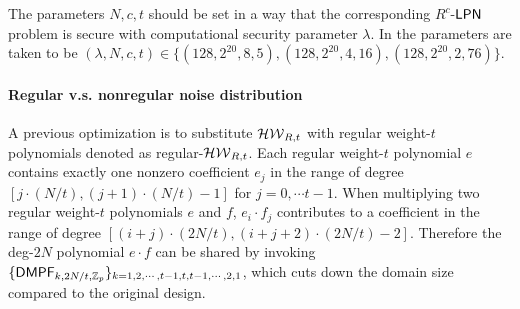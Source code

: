 The parameters $N, c, t$ should be set in a way that the corresponding $R^c$-${\sf LPN}$ problem is secure with computational security parameter $\lambda$. In \cite{cryptoeprint:2022/1035} the parameters are taken to be $(\lambda, N, c, t) \in\{ (128, 2^{20}, 8, 5), (128, 2^{20}, 4, 16), (128, 2^{20}, 2, 76)\}$. 

\paragraph{Regular v.s. nonregular noise distribution}

A previous optimization is to substitute $\mathcal{HW}_{R,t}$ with regular weight-$t$ polynomials denoted as regular-$\mathcal{HW}_{R,t}$. Each regular weight-$t$ polynomial $e$ contains exactly one nonzero coefficient $e_j$ in the range of degree $[j\cdot (N/t), (j+1)\cdot (N/t)-1]$ for $j=0,\cdots t-1$. When multiplying two regular weight-$t$ polynomials $e$ and $f$, $e_i\cdot f_j$ contributes to a coefficient in the range of degree $[(i+j)\cdot (2N/t), (i+j+2)\cdot (2N/t)-2]$. Therefore the deg-$2N$ polynomial $e\cdot f$ can be shared by invoking $\{{\sf DMPF}_{k, 2N/t, \mathbb{Z}_p}\}_{k=1,2,\cdots,t-1,t,t-1,\cdots, 2,1}$, which cuts down the domain size compared to the original design. 

